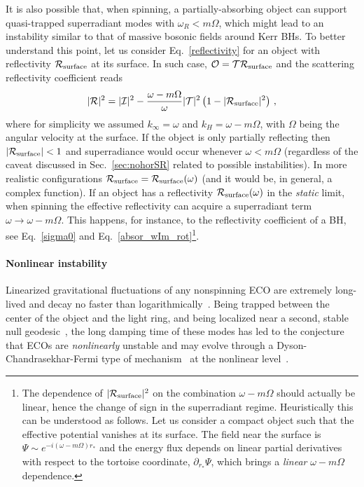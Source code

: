 \documentclass[11pt]{article}
\numberwithin{equation}{section} %
\begin{document}
It is also possible that, when spinning, a partially-absorbing object can support quasi-trapped superradiant modes 
with $\omega_R<m\Omega$, which might lead to an instability similar to that of massive bosonic fields around Kerr 
BHs. To better understand this point, let us consider 
Eq.~\eqref{reflectivity} for an object with reflectivity ${\cal R}_{\rm surface}$ at its surface. In such case, ${\cal 
O}={\cal T}{\cal R}_{\rm surface}$ and the scattering reflectivity 
coefficient reads
\begin{equation}
 |{\cal R}|^2=|{\cal I}|^2-\frac{\omega-m\Omega}{\omega}|{\cal T}|^2\left(1-|{\cal R}_{\rm 
surface}|^2\right)\,,\label{reflectivity2}
\end{equation}
where for simplicity we assumed $k_\infty=\omega$ and $k_H=\omega-m\Omega$, with $\Omega$ being 
the angular velocity at the surface. 
If the object is only partially reflecting then $|{\cal R}_{\rm surface}|<1$ 
and superradiance would occur whenever $\omega<m\Omega$ (regardless of the caveat discussed in Sec.~\ref{sec:nohorSR} 
related to possible instabilities). In more 
realistic configurations ${\cal R}_{\rm surface}={\cal R}_{\rm surface}(\omega)$ (and it would be, in general, a 
complex function). If an object has a reflectivity ${\cal R}_{\rm surface}(\omega)$ in the \emph{static} limit, when 
spinning the effective reflectivity can acquire a superradiant term $\omega\to \omega-m\Omega$. This happens, for 
instance, to the reflectivity coefficient of a BH, see Eq.~\eqref{sigma0} and 
Eq.~\eqref{absor_wIm_rot}\footnote{The dependence of $|{\cal R}_{\rm surface}|^2$ on the combination 
$\omega-m\Omega$ should actually be linear, hence the 
change of sign in the superradiant regime. Heuristically this can be understood as follows. Let us consider a compact 
object such that the effective potential vanishes at its surface. The field near 
the surface is $\Psi\sim e^{-i (\omega-m\Omega) r_*}$ and the energy flux depends on linear partial derivatives with 
respect to the tortoise coordinate, $\partial_{r_*}\Psi$, which brings a \emph{linear} $\omega-m\Omega$ dependence.}. 



\paragraph{Nonlinear instability}
Linearized gravitational fluctuations of any 
nonspinning ECO are extremely long-lived and decay no faster than 
logarithmically~\cite{Keir:2014oka,Cardoso:2014sna,Eperon:2016cdd,Eperon:2017bwq}. 
%
Being trapped between the center of the
object and the light ring, and being localized near a second, stable null geodesic~\cite{Cardoso:2014sna,Cunha:2017qtt}, 
the long damping time of 
these modes has led to the conjecture that ECOs are \emph{nonlinearly} unstable and may 
evolve through a Dyson-Chandrasekhar-Fermi type of mechanism~\cite{Dyson:1893:1,Dyson:1893:2,1953ApJ...118..116C} at the 
nonlinear level~\cite{Keir:2014oka,Cardoso:2014sna}.
\end{document}
